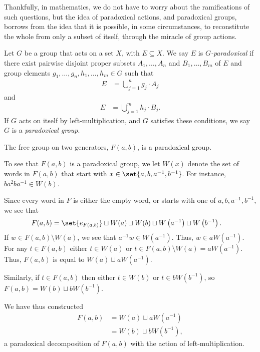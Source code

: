 \documentclass[10pt]{mypackage2}
\begin{document}
Thankfully, in mathematics, we do not have to worry about the ramifications of such questions, but the idea of paradoxical actions, and paradoxical groups, borrows from the idea that it is possible, in some circumstances, to reconstitute the whole from only a subset of itself, through the miracle of group actions.
\begin{definition}
  Let $G$ be a group that acts on a set $X$, with $E\subseteq X$. We say $E$ is $G$\textit{-paradoxical} if there exist pairwise disjoint proper subsets $A_1,\dots,A_n$ and $B_1,\dots,B_m$ of $E$ and group elements $g_1,\dots,g_n,h_1,\dots,h_m\in G$ such that
  \begin{align*}
    E &= \bigcup_{j=1}^{n}g_j\cdot A_j
  \end{align*}
  and
  \begin{align*}
    E &= \bigcup_{j=1}^{m}h_j\cdot B_j.
  \end{align*}
  If $G$ acts on itself by left-multiplication, and $G$ satisfies these conditions, we say $G$ is a \textit{paradoxical group}.
\end{definition}
\begin{example}
  The free group on two generators, $F(a,b)$, is a paradoxical group.\newline

  To see that $F(a,b)$ is a paradoxical group, we let $W(x)$ denote the set of words in $F(a,b)$ that start with $x\in \set{a,b,a^{-1},b^{-1}}$. For instance, $ba^2ba^{-1}\in W(b)$.\newline

  Since every word in $F$ is either the empty word, or starts with one of $a,b,a^{-1},b^{-1}$, we see that
  \begin{align*}
    F(a,b) &= \set{e_{F(a,b)}} \sqcup W(a) \sqcup W(b) \sqcup W\left(a^{-1}\right) \sqcup W\left(b^{-1}\right).
  \end{align*}
  If $w\in F(a,b)\setminus W(a)$, we see that $a^{-1}w\in W\left(a^{-1}\right)$. Thus, $w\in aW\left(a^{-1}\right)$. For any $t\in F(a,b)$ either $t\in W(a)$ or $t\in F(a,b)\setminus W(a) = aW\left(a^{-1}\right)$. Thus, $F\left(a,b\right) $ is equal to $ W(a)\sqcup aW\left(a^{-1}\right)$.\newline

  Similarly, if $t\in F(a,b)$ then either $t\in W(b)$ or $t\in bW\left( b^{-1} \right)$, so $F(a,b) = W(b)\sqcup bW\left( b^{-1} \right)$.\newline

  We have thus constructed
  \begin{align*}
    F(a,b) &= W(a)\sqcup aW\left(a^{-1}\right)\\
           &= W(b)\sqcup bW\left(b^{-1}\right),
  \end{align*}
  a paradoxical decomposition of $F(a,b)$ with the action of left-multiplication.
\end{example}
\end{document}
